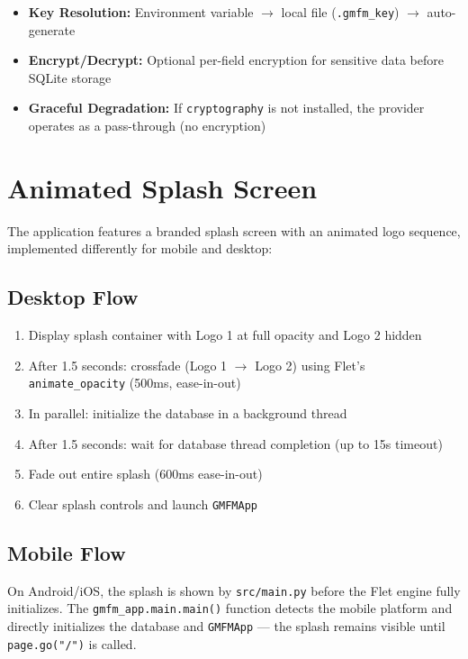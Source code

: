 \documentclass[12pt,a4paper]{article}
\begin{document}
\begin{itemize}[leftmargin=2em]
    \item \textbf{Key Resolution:} Environment variable $\rightarrow$ local file (\texttt{.gmfm\_key}) $\rightarrow$ auto-generate
    \item \textbf{Encrypt/Decrypt:} Optional per-field encryption for sensitive data before SQLite storage
    \item \textbf{Graceful Degradation:} If \texttt{cryptography} is not installed, the provider operates as a pass-through (no encryption)
\end{itemize}

\section{Animated Splash Screen}

The application features a branded splash screen with an animated logo sequence, implemented differently for mobile and desktop:

\subsection{Desktop Flow}

\begin{enumerate}[leftmargin=2em]
    \item Display splash container with Logo 1 at full opacity and Logo 2 hidden
    \item After 1.5 seconds: crossfade (Logo 1 $\rightarrow$ Logo 2) using Flet's \texttt{animate\_opacity} (500ms, ease-in-out)
    \item In parallel: initialize the database in a background thread
    \item After 1.5 seconds: wait for database thread completion (up to 15s timeout)
    \item Fade out entire splash (600ms ease-in-out)
    \item Clear splash controls and launch \texttt{GMFMApp}
\end{enumerate}

\subsection{Mobile Flow}

On Android/iOS, the splash is shown by \texttt{src/main.py} before the Flet engine fully initializes. The \texttt{gmfm\_app.main.main()} function detects the mobile platform and directly initializes the database and \texttt{GMFMApp} — the splash remains visible until \texttt{page.go("/")} is called.
\end{document}
